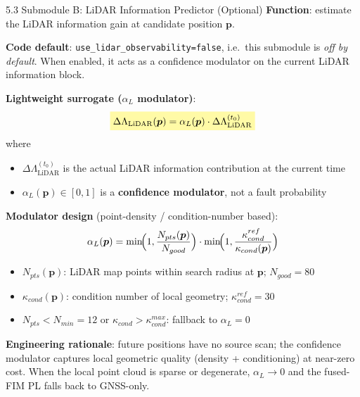 \documentclass[10pt,aspectratio=169,xcolor=dvipsnames]{beamer}
\newcommand{\1}{\mathbb{1}}
\newcommand{\hlb}[1]{\colorbox{yellow!35}{\(\displaystyle #1\)}}
\begin{document}
\begin{frame}{5.3 Submodule B: LiDAR Information Predictor (Optional)}
  \small
  \textbf{Function}: estimate the LiDAR information gain at candidate position $\bm{p}$.

  \textbf{Code default}: \texttt{use\_lidar\_observability=false}, i.e.\ this submodule is \emph{off by default}. When enabled, it acts as a confidence modulator on the current LiDAR information block.

  \medskip
  \textbf{Lightweight surrogate ($\alpha_L$ modulator)}:
  \[
    \hlb{
      \Delta\Lambda_{\mathrm{LiDAR}}(\bm{p})=\alpha_L(\bm{p})\cdot\Delta\Lambda_{\mathrm{LiDAR}}^{(t_0)}
    }
  \]
  where
  \begin{itemize}\scriptsize
    \item $\Delta\Lambda_{\mathrm{LiDAR}}^{(t_0)}$ is the actual LiDAR information contribution at the current time
    \item $\alpha_L(\bm{p})\in[0,1]$ is a \textbf{confidence modulator}, not a fault probability
  \end{itemize}

  \textbf{Modulator design} (point-density / condition-number based):
  \[
    \alpha_L(\bm{p})=\min\!\Bigl(1,\frac{N_{pts}(\bm{p})}{N_{good}}\Bigr)\cdot
    \min\!\Bigl(1,\frac{\kappa_{cond}^{ref}}{\kappa_{cond}(\bm{p})}\Bigr)
  \]
  \begin{itemize}\tiny
    \item $N_{pts}(\bm{p})$: LiDAR map points within search radius at $\bm{p}$; $N_{good}=80$
    \item $\kappa_{cond}(\bm{p})$: condition number of local geometry; $\kappa_{cond}^{ref}=30$
    \item $N_{pts}<N_{min}=12$ or $\kappa_{cond}>\kappa_{cond}^{max}$: fallback to $\alpha_L=0$
  \end{itemize}

  \footnotesize
  \textbf{Engineering rationale}: future positions have no source scan; the confidence modulator captures local geometric quality (density + conditioning) at near-zero cost. When the local point cloud is sparse or degenerate, $\alpha_L\to0$ and the fused-FIM PL falls back to GNSS-only.
\end{frame}
\end{document}
